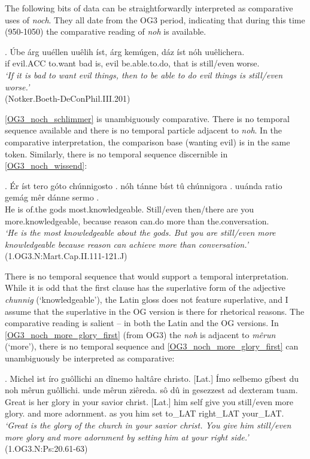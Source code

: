 \documentclass[output=paper,
modfonts
]{langscibook}
\begin{document}
The following bits of data can be straightforwardly interpreted as comparative uses of \textit{noch}. They all date from the OG3 period, indicating that during this time (950-1050) the comparative reading of \textit{noh} is available.

\exg. Úbe árg uuéllen uuêlih íst, árg kemúgen, dáz íst nóh uuêlichera.\\
if evil.ACC to.want bad is, evil be.able.to.do, that is still/even worse.\\%
\textit{`If it is bad to want evil things, then to be able to do evil things is still/even worse.'}\label{OG3_noch_schlimmer} \\ \flushright \vspace{-24pt} (Notker.Boeth-DeConPhil.III.201)

\ref{OG3_noch_schlimmer} is unambiguously comparative. There is no temporal sequence available and there is no temporal particle adjacent to \textit{noh}. In the comparative interpretation, the comparison base (wanting evil) is in the same token. Similarly, there is no temporal sequence discernible in \ref{OG3_noch_wissend}:

\exg. Ér íst tero góto {chúnnigosto .} nóh tánne bíst tû {chúnnigora .} uuánda ratio gemág mêr dánne {sermo .}\\
He is of.the gods most.knowledgeable. Still/even then/there are you more.knowledgeable, because reason can.do more than the.conversation.\\
\textit{`He is the most knowledgeable about the gods. But you are still/even more knowledgeable because reason can achieve more than conversation.'}\label{OG3_noch_wissend} \\ \flushright \vspace{-24pt} (1.OG3.N:Mart.Cap.II.111-121.J)

There is no temporal sequence that would support a temporal interpretation. While it is odd that the first clause has the superlative form of the adjective \textit{chunnig} (`knowledgeable'), the Latin gloss does not feature superlative, and I assume that the superlative in the OG version is there for rhetorical reasons. The comparative reading is salient -- in both the Latin and the OG versions. In \ref{OG3_noch_more_glory_first} (from OG3) the \textit{noh} is adjacent to \textit{mêrun} (`more'), there is no temporal sequence and \ref{OG3_noch_more_glory_first} can unambiguously be interpreted as comparative:

\exg. Michel ist íro guôllichi an dînemo haltâre christo. [Lat.] Ímo selbemo gíbest du noh mêrun guôllichi. unde mêrun ziêreda. sô dû in gesezzest ad dexteram tuam.\\
Great is her glory in your savior christ. [Lat.] him self give you still/even more glory. and more adornment. as you him set to\_LAT right\_LAT your\_LAT.\\
\textit{`Great is the glory of the church in your savior christ. You give him still/even more glory and more adornment by setting him at your right side.'}\label{OG3_noch_more_glory_first} \\ \flushright \vspace{-24pt} (1.OG3.N:Ps:20.61-63)
\end{document}
